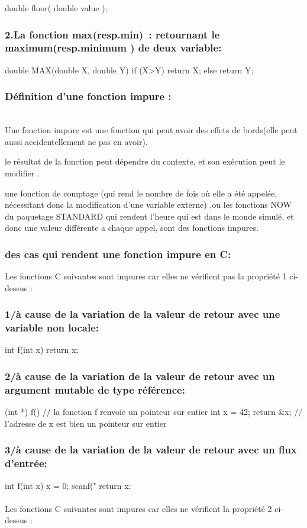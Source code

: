 \documentclass[12pt,titlepage]{report}
\begin{document}
double      floor( double value );


\subsubsection{2.La fonction max(resp.min) :  retournant le maximum(resp.minimum ) de deux variable:}
double MAX(double X, double Y)
{
    if (X>Y) return X;
    else return Y;
}
\subsubsection{Définition d’une fonction impure :}

\\Une fonction impure est une fonction qui peut avoir des effets de bords(elle peut aussi accidentellement ne pas en avoir).

le résultat de la fonction peut dépendre du contexte, et son exécution peut le modifier .

une fonction de comptage (qui rend le nombre de fois où elle a été appelée, nécessitant donc la modification d’une variable externe) ,ou les fonctions NOW du paquetage STANDARD qui rendent l’heure qui est dans le monde simulé, et donc une valeur différente a chaque appel, sont des  fonctions impures.\\

\subsubsection{ des cas qui rendent une fonction impure en C:}

Les fonctions C suivantes sont impures car elles ne vérifient pas la propriété 1 ci-dessus :

\subsubsection{1/à cause de la variation de la valeur de retour avec une variable non locale:}
int f(int x) {
    return x;
}

\subsubsection{2/à cause de la variation de la valeur de retour avec un argument mutable de type référence:}
(int *) f() { // la fonction f renvoie un pointeur sur entier
    int x = 42;
    return &x; // l'adresse de x est bien un pointeur sur entier
}

\subsubsection{3/à cause de la variation de la valeur de retour avec un flux d'entrée:}
int f(int x) {
    x = 0;
    scanf("%
    return x;\\
}
\\Les fonctions C suivantes sont impures car elles ne vérifient la propriété 2 ci-dessus :\\
\end{document}

